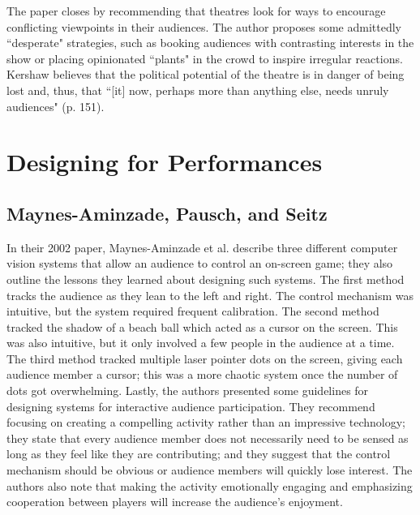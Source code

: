 The paper closes by recommending that theatres look for ways to encourage conflicting viewpoints in their audiences. The author proposes some admittedly ``desperate" strategies, such as booking audiences with contrasting interests in the show or placing opinionated ``plants" in the crowd to inspire irregular reactions. Kershaw believes that the political potential of the theatre is in danger of being lost and, thus, that ``[it] now, perhaps more than anything else, needs unruly audiences" (p. 151).

\section{Designing for Performances}

\subsection{Maynes-Aminzade, Pausch, and Seitz}

In their 2002 paper, Maynes-Aminzade et al. describe three different computer vision systems that allow an audience to control an on-screen game; they also outline the lessons they learned about designing such systems. The first method tracks the audience as they lean to the left and right. The control mechanism was intuitive, but the system required frequent calibration. The second method tracked the shadow of a beach ball which acted as a cursor on the screen. This was also intuitive, but it only involved a few people in the audience at a time. The third method tracked multiple laser pointer dots on the screen, giving each audience member a cursor; this was a more chaotic system once the number of dots got overwhelming. Lastly, the authors presented some guidelines for designing systems for interactive audience participation. They recommend focusing on creating a compelling activity rather than an impressive technology; they state that every audience member does not necessarily need to be sensed as long as they feel like they are contributing; and they suggest that the control mechanism should be obvious or audience members will quickly lose interest. The authors also note that making the activity emotionally engaging and emphasizing cooperation between players will increase the audience's enjoyment.

